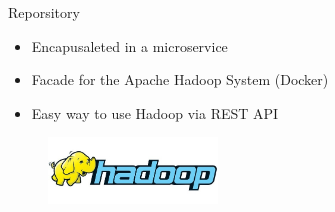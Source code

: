 \begin{frame}{Reporsitory}
	\begin{itemize}
		\item Encapusaleted in a microservice
		\item Facade for the Apache Hadoop System (Docker)
		\item Easy way to use Hadoop via REST API
	\end{itemize}

	\begin{figure}[htbp]
  		\centering
  		\includegraphics[width=0.4\textwidth]{figures/hadoop}
	\end{figure}
\end{frame}